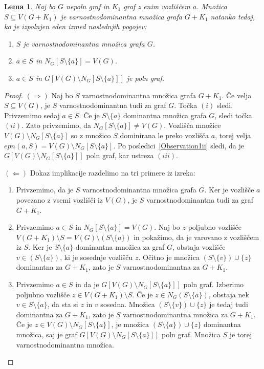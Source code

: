 \documentclass[12pt,a4paper,twoside]{article}
\theoremstyle{definition} %
\theoremstyle{plain} %
\newtheorem{lema}[definicija]{Lema}
\numberwithin{equation}{section}  %
\begin{document}
\begin{lema}\label{lemaSpojZVozliščem}{\rm{\cite[Corollary 2.8]{castillano2014secure}}}
Naj bo $G$ nepoln graf in $K_1$ graf z enim vozliščem $a$. Množica $S \subseteq V( G + K_1)$ je varnostnodominantna množica grafa $G + K_1$ natanko tedaj, ko je izpolnjen eden izmed naslednjih pogojev:
\begin{enumerate}[label=(\roman*)]
\item $S$ je varnostnodominantna množica grafa $G$.
\item $a \in S$ in $N_G[S \setminus \{a\}] = V(G)$.
\item $a \in S$ in $G[V(G) \setminus N_G[S \setminus \{a\}]]$ je poln graf.
\end{enumerate}
\end{lema}
\begin{proof}
$(\Rightarrow)$  Naj bo $S$ varnostnodominantna množica grafa $G + K_1$. Če velja $S \subseteq V(G)$, je $S$ varnostnodominantna tudi za graf $G$. Točka $(i)$ sledi. Privzemimo sedaj $a \in S$. Če je $S \setminus \{a\}$ dominantna množica grafa $G$, sledi točka $(ii)$. Zato privzemimo, da $N_G[S \setminus \{a\}] \neq V(G)$. Vozlišča množice $V(G) \setminus N_G[S \setminus \{a\}]$ so z množico $S$ dominirana le preko vozlišča $a$, torej velja $epn(a, S) = V(G) \setminus N_G[S \setminus \{a\}]$.  Po posledici~\ref{Observation1ii} sledi, da je $G[V(G) \setminus N_G[S \setminus \{a\}]]$ poln graf, kar ustreza $(iii)$.

\medskip
\noindent
$(\Leftarrow)$ Dokaz implikacije razdelimo na tri primere iz izreka:
\begin{enumerate}[label=($\roman*$)]
\item Privzemimo, da je $S$ varnostnodominantna množica grafa $G$. Ker je vozlišče $a$ povezano z vsemi vozlišči iz $V(G)$, je $S$ varnostnodominantna tudi za graf $G + K_1$.
\item Privzemimo $a \in S$ in $N_G[S \setminus \{a\}] = V(G)$. Naj bo $z$ poljubno vozlišče $V(G + K_1) \setminus S = V(G) \setminus (S \setminus \{a\})$ in pokažimo, da je varovano z vozliščem iz $S$. Ker je $S \setminus \{a\}$ dominantna množica za graf $G$, obstaja vozlišče $v \in (S \setminus \{a\})$, ki je sosednje vozlišču $z$. Očitno je množica $(S \setminus \{v\}) \cup \{z\}$ dominantna za $G + K_1$, zato je $S$ varnostnodominantna za $G + K_1$.
\item Privzemimo $a \in S$ in da je $G[V(G) \setminus N_G[S \setminus \{a\}]]$ poln graf. Izberimo poljubno vozlišče $z \in V(G + K_1) \setminus S$. Če je $z \in N_G(S \setminus \{a\})$,  obstaja nek $v\in S \setminus \{a\}$, da sta si $z$ in $v$ sosedna. Množica $(S \setminus \{v\}) \cup \{z\}$ je tedaj tudi dominantna za $G + K_1$, zato je $S$ varnostnodominantna množica za $G + K_1$. Če je $z \in V(G) \setminus N_G[S \setminus \{a\}]$, je množica $(S \setminus \{a\}) \cup \{z\}$ dominantna množica, saj je graf $G[V(G) \setminus N_G[S \setminus \{a\}]]$ poln graf. Množica $S$ je torej varnostnodominantna množica. \qedhere
\end{enumerate}
\end{proof}
\end{document}

